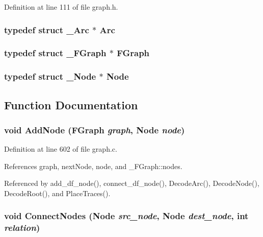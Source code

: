 Definition at line 111 of file graph.h.
\subsubsection{\setlength{\rightskip}{0pt plus 5cm}typedef struct \bf{\_\-Arc} $\ast$ \bf{Arc}}\label{graph_8h_ec2d676b53100217c650fbacb5ea52d3}


\subsubsection{\setlength{\rightskip}{0pt plus 5cm}typedef struct \bf{\_\-FGraph} $\ast$ \bf{FGraph}}\label{graph_8h_a8515812f0e60bbc0d06c043aeef9e37}


\subsubsection{\setlength{\rightskip}{0pt plus 5cm}typedef struct \bf{\_\-Node} $\ast$ \bf{Node}}\label{graph_8h_3fa1a642c425746ab683ac8fc76f932b}




\subsection{Function Documentation}
\subsubsection{\setlength{\rightskip}{0pt plus 5cm}void Add\-Node (\bf{FGraph} {\em graph}, \bf{Node} {\em node})}\label{graph_8h_5add6db4eaffa6e50b1464368ef24e51}




Definition at line 602 of file graph.c.

References graph, next\-Node, node, and \_\-FGraph::nodes.

Referenced by add\_\-df\_\-node(), connect\_\-df\_\-node(), Decode\-Arc(), Decode\-Node(), Decode\-Root(), and Place\-Traces().
\subsubsection{\setlength{\rightskip}{0pt plus 5cm}void Connect\-Nodes (\bf{Node} {\em src\_\-node}, \bf{Node} {\em dest\_\-node}, int {\em relation})}\label{graph_8h_7b0a701a76a25a53f704d4ec5e6b67d6}




